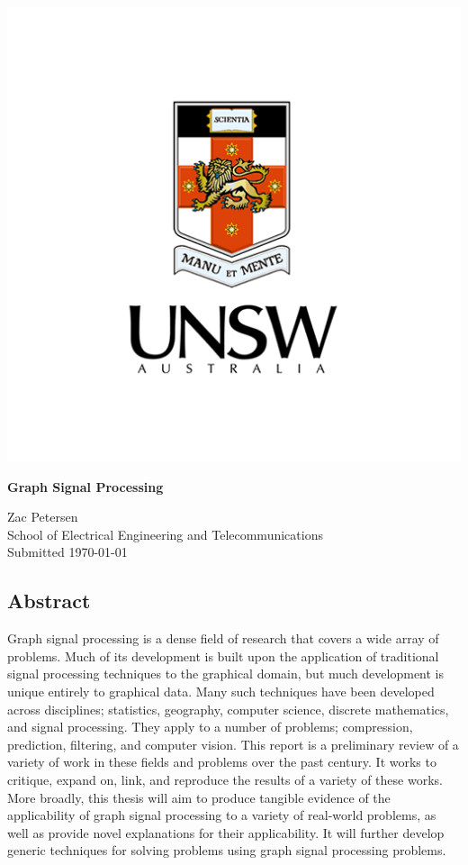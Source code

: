 \documentclass[12pt,a4paper]{article} %
\begin{document}
% 

\begin{titlepage}
    \centering
    \includegraphics[width=.7\linewidth]{unsw.png}
    \vspace{1cm}

    {\LARGE\bfseries Graph Signal Processing}
    \vspace{0.5cm}

    {\large Zac Petersen} \\
    \vspace{0.5cm}
    {School of Electrical Engineering and Telecommunications} \\
    \vspace{0.5cm}
    {Submitted \today}

\end{titlepage}

\begin{center}
    \subsection*{Abstract}
\end{center}
Graph signal processing is a dense field of research that covers a wide array of problems. Much of its development is built upon the application of traditional signal processing techniques to the graphical domain, but much development is unique entirely to graphical data. Many such techniques have been developed across disciplines; statistics, geography, computer science, discrete mathematics, and signal processing. They apply to a number of problems; compression, prediction, filtering, and computer vision. This report is a preliminary review of a variety of work in these fields and problems over the past century. It works to critique, expand on, link, and reproduce the results of a variety of these works. More broadly, this thesis will aim to produce tangible evidence of the applicability of graph signal processing to a variety of real-world problems, as well as provide novel explanations for their applicability. It will further develop generic techniques for solving problems using graph signal processing problems.
\end{document}
